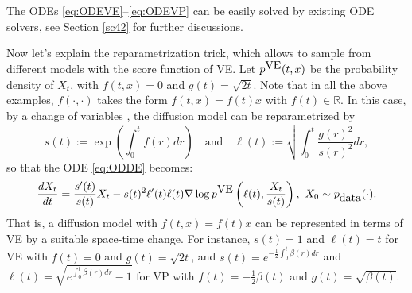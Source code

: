 \documentclass[letterpaper,11pt,reqno]{amsart}
\numberwithin{equation}{section}
\begin{document}

The ODEs \eqref{eq:ODEVE}--\eqref{eq:ODEVP}
can be easily solved by existing ODE solvers, see Section \ref{sc42} for further discussions.

\quad Now let's explain the reparametrization trick, which allows to sample from different models
with the score function of VE.
Let $p^{\tiny \mbox{VE}}(t,x)$ be the probability density of $X_t$, with $f(t,x) = 0$ and $g(t)= \sqrt{2t}$.
Note that in all the above examples, 
$f(\cdot, \cdot)$ takes the form $f(t,x) = f(t) x$ with $f(t) \in \mathbb{R}$.
In this case, by a change of variables \cite{karras2022elucidating},
the diffusion model can be reparametrized by
\begin{equation}
    s(t):= \exp\left(\int_0^t f(r) dr \right) \quad \mbox{and} \quad \ell(t):=\sqrt{\int_0^t \frac{g(r)^2}{s(r)^2} dr},
\end{equation}
 so that the ODE \eqref{eq:ODDE} becomes:
\begin{equation}
    \frac{dX_t}{dt} = \frac{s'(t)}{s(t)} X_t - s(t)^2 \ell'(t) \ell(t) \nabla \log p^{\tiny \mbox{VE}}\left(\ell(t), \frac{X_t}{s(t)} \right), \,\, X_0 \sim p_{\tiny \mbox{data}}(\cdot).
\end{equation}
That is, a diffusion model with $f(t,x) = f(t) x$ can be represented in terms of VE by a suitable space-time change.
For instance, 
$s(t) = 1$ and $\ell(t) = t$ for VE with $f(t) = 0$ and $g(t) = \sqrt{2t}$,
and 
$s(t) =e^{-\frac{1}{2}\int_0^t \beta(r) dr}$ and $\ell (t) = \sqrt{e^{\int_0^t \beta(r) dr} - 1}$ for VP with $f(t) = -\frac{1}{2} \beta (t)$ and $g(t) = \sqrt{\beta(t)}$.
\end{document}

